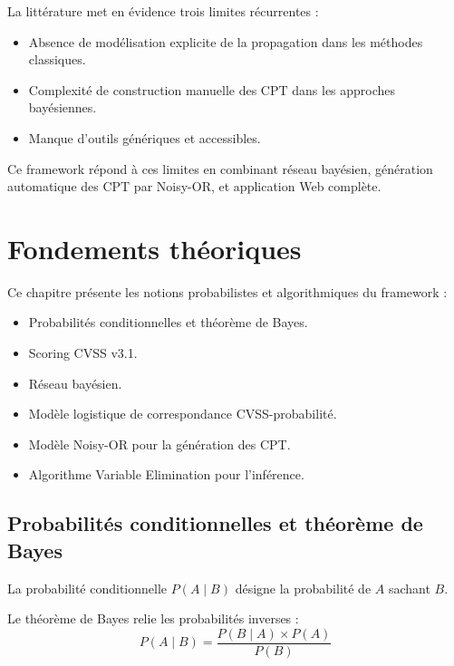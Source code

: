 \documentclass[12pt,a4paper]{article}
\newcommand{\forcereset}[1]{}
\begin{document}
La littérature met en évidence trois limites récurrentes :

\begin{itemize}[leftmargin=1.2cm, itemsep=0.2\baselineskip]
    \item Absence de modélisation explicite de la propagation dans les méthodes classiques.
    \item Complexité de construction manuelle des CPT dans les approches bayésiennes.
    \item Manque d'outils génériques et accessibles.
\end{itemize}

Ce framework répond à ces limites en combinant réseau bayésien, génération automatique des CPT par Noisy-OR, et application Web complète.

\section{Fondements théoriques}
\forcereset{6}

Ce chapitre présente les notions probabilistes et algorithmiques du framework :

\begin{itemize}
    \item Probabilités conditionnelles et théorème de Bayes.
    \item Scoring CVSS v3.1.
    \item Réseau bayésien.
    \item Modèle logistique de correspondance CVSS-probabilité.
    \item Modèle Noisy-OR pour la génération des CPT.
    \item Algorithme Variable Elimination pour l'inférence.
\end{itemize}

\subsection{Probabilités conditionnelles et théorème de Bayes}
\forcereset{5}

La probabilité conditionnelle $P(A \mid B)$ désigne la probabilité de $A$ sachant $B$.

Le théorème de Bayes relie les probabilités inverses :
\[
P(A \mid B) = \frac{P(B \mid A) \times P(A)}{P(B)}
\]
\end{document}
